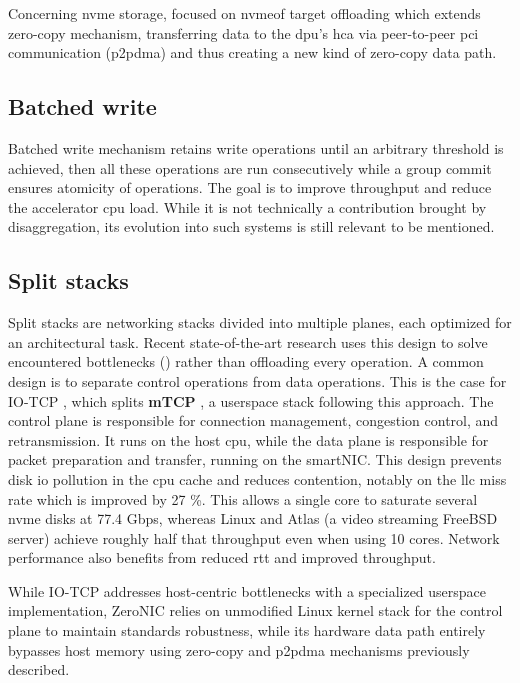 Concerning \acrshort{nvme} storage,  focused on \acrshort{nvmeof} target offloading which extends zero-copy mechanism,
transferring data to the \acrfull{dpu}'s \acrfull{hca} via peer-to-peer \acrfull{pci} communication (\acrfull{p2pdma}) and thus creating a new
kind of zero-copy data path.

\subsection{Batched write}

Batched write mechanism retains write operations until an arbitrary threshold is achieved, then all these operations are run
consecutively while a group commit ensures atomicity of operations. The goal is to improve throughput and reduce the accelerator
\acrshort{cpu} load. While it is not technically a contribution brought by disaggregation, its evolution into such systems is still relevant
to be mentioned.

\subsection{Split stacks}

Split stacks are networking stacks divided into multiple planes, each optimized for an architectural task. Recent state-of-the-art research uses this design to solve encountered bottlenecks () rather than offloading every operation. A common design is to separate control operations from data operations. This is the case for IO-TCP \cite{kim_rearchitecting_2023}, which splits \textbf{mTCP} \cite{jeong_mtcp_2014}, a userspace stack following this approach. The control plane is responsible for connection management, congestion control, and retransmission. It runs on the host \acrshort{cpu}, while the data plane is responsible for packet preparation and transfer, running on the smartNIC. This design prevents disk \acrshort{io} pollution in the \acrshort{cpu} cache and reduces contention, notably on the \acrfull{llc} miss rate which is improved by 27 \%. This allows a single core to saturate several \acrshort{nvme} disks at 77.4 Gbps, whereas Linux and Atlas \cite{marinos_diskcryptnet_2017} (a video streaming FreeBSD server) achieve roughly half that throughput even when using 10 cores. Network performance also benefits from reduced \acrshort{rtt} and improved throughput.

While IO-TCP addresses host-centric bottlenecks with a specialized userspace implementation, ZeroNIC \cite{skiadopoulos_high-throughput_2024} relies on unmodified Linux kernel stack for the control plane to maintain standards robustness, while its hardware data path entirely bypasses host memory using zero-copy and \acrshort{p2pdma} mechanisms previously described.

